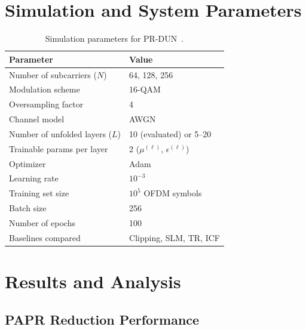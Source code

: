 \section{Simulation and System Parameters}
\label{sec:prdun_params}

\begin{table}[H]
    \centering
    \caption{Simulation parameters for PR-DUN~\cite{nguyen2022deep}.}
    \label{tab:prdun_params}
    \begin{tabular}{@{} l l @{}}
        \toprule
        \textbf{Parameter} & \textbf{Value} \\
        \midrule
        Number of subcarriers ($N$) & 64, 128, 256 \\
        Modulation scheme & 16-QAM \\
        Oversampling factor & 4 \\
        Channel model & AWGN \\
        Number of unfolded layers ($L$) & 10 (evaluated) or 5--20 \\
        Trainable params per layer & 2 ($\mu^{(\ell)}$, $\epsilon^{(\ell)}$) \\
        Optimizer & Adam \\
        Learning rate & $10^{-3}$ \\
        Training set size & $10^5$ OFDM symbols \\
        Batch size & 256 \\
        Number of epochs & 100 \\
        Baselines compared & Clipping, SLM, TR, ICF \\
        \bottomrule
    \end{tabular}
\end{table}


\section{Results and Analysis}
\label{sec:prdun_results}

\subsection{PAPR Reduction Performance}

